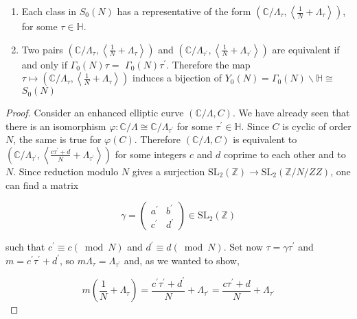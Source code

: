 \begin{proposition}
    \begin{enumerate}
  \item Each class in $S_{0}(N)$ has a representative of the form $\left(\mathbb{C} / \Lambda_{\tau},\left\langle\frac{1}{N}+\Lambda_{\tau}\right\rangle\right)$, for some $\tau \in \mathbb{H}$.

  \item Two pairs $\left(\mathbb{C} / \Lambda_{\tau},\left\langle\frac{1}{N}+\Lambda_{\tau}\right\rangle\right)$ and $\left(\mathbb{C} / \Lambda_{\tau^{\prime}},\left\langle\frac{1}{N}+\Lambda_{\tau^{\prime}}\right\rangle\right)$ are equivalent if and only if $\Gamma_{0}(N) \tau=$ $\Gamma_{0}(N) \tau^{\prime}$. Therefore the map $\tau \mapsto\left(\mathbb{C} / \Lambda_{\tau},\left\langle\frac{1}{N}+\Lambda_{\tau}\right\rangle\right)$ induces a bijection of $Y_{0}(N)=\Gamma_{0}(N) \backslash \mathbb{H} \cong$ $S_{0}(N)$

\end{enumerate}
\begin{proof}
    Consider an enhanced elliptic curve $(\mathbb{C} / \Lambda, C)$. We have already seen that there is an isomorphism $\varphi: \mathbb{C} / \Lambda \cong \mathbb{C} / \Lambda_{\tau^{\prime}}$ for some $\tau^{\prime} \in \mathbb{H}$. Since $C$ is cyclic of order $N$, the same is true for $\varphi(C)$. Therefore $(\mathbb{C} / \Lambda, C)$ is equivalent to $\left(\mathbb{C} / \Lambda_{\tau^{\prime}},\left\langle\frac{c \tau^{\prime}+d}{N}+\Lambda_{\tau^{\prime}}\right\rangle\right)$ for some integers $c$ and $d$ coprime to each other and to $N$. Since reduction modulo $N$ gives a surjection $\mathrm{SL}_{2}(\mathbb{Z}) \rightarrow \mathrm{SL}_{2}(\mathbb{Z} / N / Z Z)$, one can find a matrix

$$
\gamma=\left(\begin{array}{ll}
a^{\prime} & b^{\prime} \\
c^{\prime} & d^{\prime}
\end{array}\right) \in \mathrm{SL}_{2}(\mathbb{Z})
$$

such that $c^{\prime} \equiv c(\bmod N)$ and $d^{\prime} \equiv d(\bmod N)$. Set now $\tau=\gamma \tau^{\prime}$ and $m=c^{\prime} \tau^{\prime}+d^{\prime}$, so $m \Lambda_{\tau}=\Lambda_{\tau^{\prime}}$ and, as we wanted to show,

$$
m\left(\frac{1}{N}+\Lambda_{\tau}\right)=\frac{c^{\prime} \tau^{\prime}+d^{\prime}}{N}+\Lambda_{\tau^{\prime}}=\frac{c \tau^{\prime}+d}{N}+\Lambda_{\tau^{\prime}}
$$


\end{proof}
\end{proposition}
